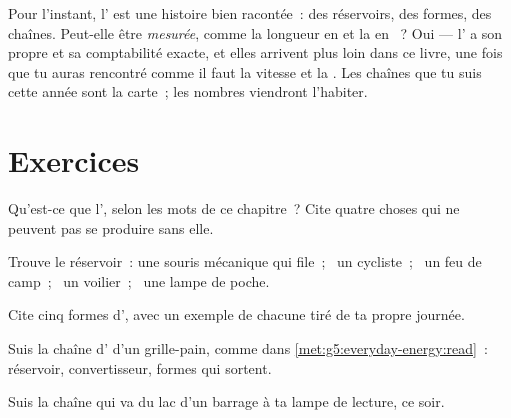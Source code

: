 \begin{remark}\label{rem:g5:everyday-energy:promise}
Pour l'instant, l' est une histoire bien racontée~: des
réservoirs, des formes, des chaînes. Peut-elle être \emph{mesurée},
comme la longueur en  et la  en ~? Oui ---
l' a son  propre et sa comptabilité exacte, et elles
arrivent plus loin dans ce livre, une fois que tu auras rencontré
comme il faut la vitesse et la . Les chaînes que tu suis cette
année sont la carte~; les nombres viendront l'habiter.
\end{remark}

\section{Exercices}

\begin{exercise}[$\star$]\label{exo:g5:everyday-energy:1}
Qu'est-ce que l', selon les mots de ce chapitre~? Cite quatre
choses qui ne peuvent pas se produire sans elle.
\end{exercise}

\begin{exercise}[$\star$]\label{exo:g5:everyday-energy:2}
Trouve le réservoir~: une souris mécanique qui file~; \ un
cycliste~; \ un feu de camp~; \ un voilier~; \ une lampe de poche.
\end{exercise}

\begin{exercise}[$\star$]\label{exo:g5:everyday-energy:3}
Cite cinq formes d', avec un exemple de chacune tiré de ta
propre journée.
\end{exercise}

\begin{exercise}[$\star$]\label{exo:g5:everyday-energy:4}
Suis la chaîne d' d'un grille-pain, comme dans
\cref{met:g5:everyday-energy:read}~: réservoir, convertisseur, formes
qui sortent.
\end{exercise}

\begin{exercise}[$\star$]\label{exo:g5:everyday-energy:5}
Suis la chaîne qui va du lac d'un barrage à ta lampe de lecture, ce
soir.
\end{exercise}

